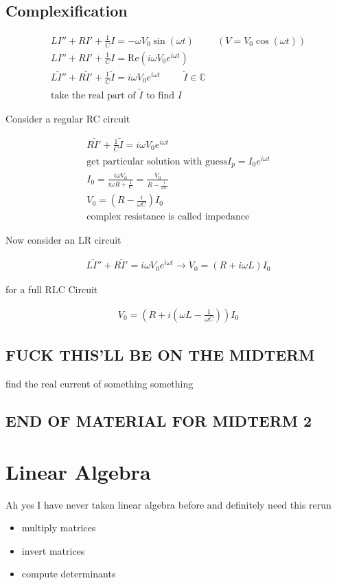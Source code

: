 \documentclass[fleqn]{report}
\newcommand{\hp}{\hspace{1cm}}
\newcommand{\comment}[1]{}
\newcommand{\equations} [1] {
\begin{gather*}
#1
\end{gather*}
}
\begin{document}
\comment{
\[
L \frac{dI}{dt} + RI = \frac{ \int^t_0 I \, dt}{C} = V(t)
\]
}

\section{Complexification}
\equations{
L I'' + R I' + \frac{1}{C}I = - \omega V_0 \sin (\omega t)
 \hp (V = V_0 \cos (\omega t))
\\
L I'' + R I' + \frac{1}{C}I = \textrm{Re}(i \omega V_0 e^{i \omega t})
\\
L \widetilde I'' + R \widetilde I' + \frac{1}{C} \widetilde I = i \omega V_0 e^{i \omega t} 
\hp \widetilde I \in \mathbb{C}
\\
\textrm{take the real part of $\widetilde I$ to find $I$}
}

Consider a regular RC circuit
 
\equations{
R \widetilde I' + \frac{1}{C} \widetilde I = i \omega V_0 e^{i \omega t} 
\\
\textrm{get particular solution with guess} I_p = I_0 e^{i \omega t}
\\
I_0 = \frac{i \omega V_0}{i \omega R + \frac{1}{C}} =
\frac{V_0}{R - \frac{i}{\omega C}} 
\\
V_0 = (R - \frac{i}{\omega C}) I_0
\\
\textrm{complex resistance is called impedance}
}

Now consider an LR circuit
\equations{
L \widetilde I'' + R \widetilde I' = i \omega V_0 e^{i \omega t}
\rightarrow
V_0 = (R + i \omega L) I_0
}

for a full RLC Circuit
\equations{
V_0 = (R + i(\omega L - \frac{1}{\omega C})) I_0
}


\section{FUCK THIS'LL BE ON THE MIDTERM}
find the real current of something something
 
\section{END OF MATERIAL FOR MIDTERM 2}

\chapter{Linear Algebra}
Ah yes I have never taken linear algebra before and definitely need this rerun
\begin{itemize}
\item
multiply matrices
\item
invert matrices
\item
compute determinants
\end{itemize}
\end{document}
